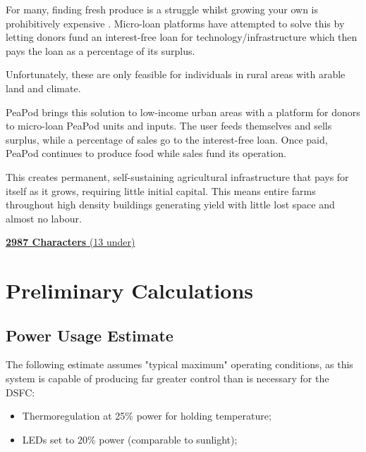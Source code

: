 \documentclass{report}
\begin{document}
For many, finding fresh produce is a struggle whilst growing your own is prohibitively expensive \cite{foodsecurity}. Micro-loan platforms have attempted to solve this by letting donors fund an interest-free loan for technology/infrastructure which then pays the loan as a percentage of its surplus. 

Unfortunately, these are only feasible for individuals in rural areas with arable land and climate.

PeaPod brings this solution to low-income urban areas with a platform for donors to micro-loan PeaPod units and inputs. The user feeds themselves and sells surplus, while a percentage of sales go to the interest-free loan. Once paid, PeaPod continues to produce food while sales fund its operation. 

This creates permanent, self-sustaining agricultural infrastructure that pays for itself as it grows, requiring little initial capital. This means entire farms throughout high density buildings generating yield with little lost space and almost no labour.

\uline{\textbf{2987 Characters} (13 under)}

\newpage

\appendix

\section{Preliminary Calculations}

\subsection{Power Usage Estimate}
\label{app:power}

The following estimate assumes "typical maximum" operating conditions, as this system is capable of producing far greater control than is necessary for the DSFC:
\begin{itemize}
    \item Thermoregulation at 25\% power for holding temperature;
    \item LEDs set to 20\% power (comparable to sunlight);
\end{itemize}
\end{document}
